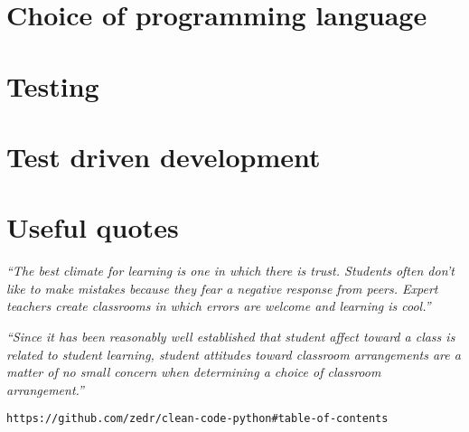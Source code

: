 \documentclass[10pt]{article}
\begin{document}
\section{Choice of programming language}

\section{Testing}

\section{Test driven development}

\section{Useful quotes}
 
\begin{center} 
\emph{``The best climate for learning is one in which there is trust. Students often don’t like to make mistakes because they fear a negative response from peers. Expert teachers create classrooms in which errors are welcome and learning is cool.''} \cite{Hat12}
\end{center}
 
\begin{center} 
\emph{``Since it has been reasonably well established that student affect toward a class is related to student learning, student attitudes toward classroom arrangements are a matter of no small concern when determining a choice of classroom arrangement.''} \cite{MM78}
\end{center}

\begin{verbatim}
https://github.com/zedr/clean-code-python#table-of-contents
\end{verbatim}
\end{document}
